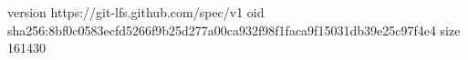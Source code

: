 version https://git-lfs.github.com/spec/v1
oid sha256:8bf0c0583ecfd5266f9b25d277a00ca932f98f1faca9f15031db39e25c97f4e4
size 161430
